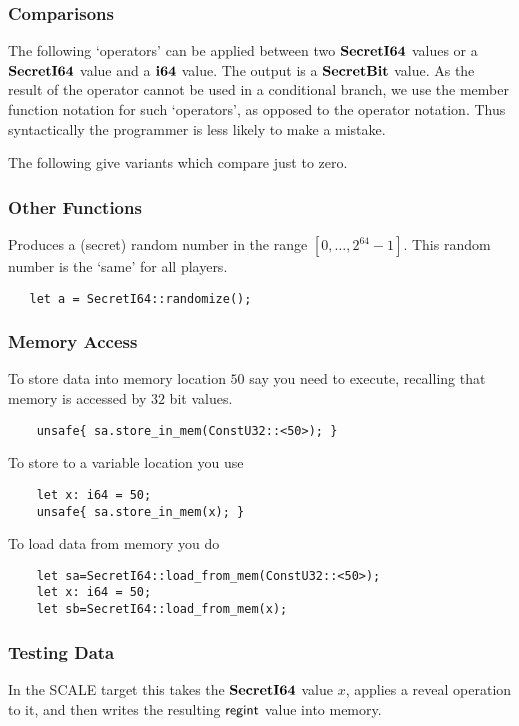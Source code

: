 \subsubsection{Comparisons}
The following `operators' can be applied between two $\mathbf{SecretI64}$ values
or a $\mathbf{SecretI64}$ value and a $\mathbf{i64}$ value. The output is a $\mathbf{SecretBit}$
value.
As the result of the operator cannot be used in a conditional branch,
we use the member function notation for such `operators', as opposed
to the operator notation. Thus syntactically the programmer is less
likely to make a mistake.

\noindent
The following give variants which compare just to zero.

\subsubsection{Other Functions}

Produces a (secret) random number in the range $[0,\ldots,2^{64}-1]$.
This random number is the `same' for all players.
\begin{lstlisting}
   let a = SecretI64::randomize();
\end{lstlisting}

\subsubsection{Memory Access}
To store data into memory location $50$ say you need to execute,
recalling that memory is accessed by $32$ bit values.
\begin{lstlisting}
    unsafe{ sa.store_in_mem(ConstU32::<50>); }
\end{lstlisting}
To store to a variable location you use
\begin{lstlisting}
    let x: i64 = 50;
    unsafe{ sa.store_in_mem(x); }
\end{lstlisting}

To load data from memory you do
\begin{lstlisting}
    let sa=SecretI64::load_from_mem(ConstU32::<50>);
    let x: i64 = 50;
    let sb=SecretI64::load_from_mem(x);
\end{lstlisting}


\subsubsection{Testing Data}
In the SCALE target this takes the $\mathbf{SecretI64}$ value $x$,
applies a reveal operation to it, and then writes the
resulting $\mathsf{regint}$ value into memory.

